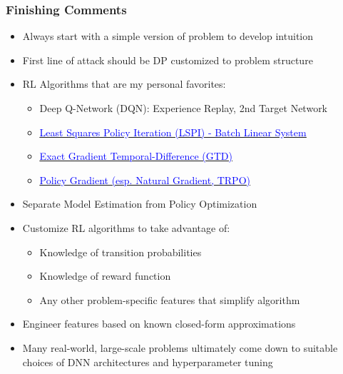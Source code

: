 \documentclass[handout]{beamer}
\begin{document}
\begin{frame}
\frametitle{Finishing Comments}
\pause
\begin{itemize}[<+->]
\item Always start with a simple version of problem to develop intuition
\item First line of attack should be DP customized to problem structure
\item RL Algorithms that are my personal favorites:
\begin{itemize}
\item Deep Q-Network (DQN): Experience Replay, 2nd Target Network
\item \href{https://github.com/coverdrive/technical-documents/blob/master/finance/cme241/ValueFunctionGeometry.pdf}{\underline{\textcolor{blue}{Least Squares Policy Iteration (LSPI) - Batch Linear System}}}
\item \href {https://github.com/coverdrive/technical-documents/blob/master/finance/cme241/ValueFunctionGeometry.pdf}{\underline{\textcolor{blue}{Exact Gradient Temporal-Difference (GTD)}}}
\item \href{https://github.com/coverdrive/technical-documents/blob/master/finance/cme241/PolicyGradient.pdf}{\underline{\textcolor{blue}{Policy Gradient (esp. Natural Gradient, TRPO)}}}
\end{itemize}
\item Separate Model Estimation from Policy Optimization
\item Customize RL algorithms to take advantage of:
\begin{itemize}
\item Knowledge of transition probabilities
\item Knowledge of reward function
\item Any other problem-specific features that simplify algorithm
\end{itemize}
\item Engineer features based on known closed-form approximations
\item Many real-world, large-scale problems ultimately come down to
suitable choices of DNN architectures and hyperparameter tuning
\end{itemize}
\end{frame}
\end{document}
